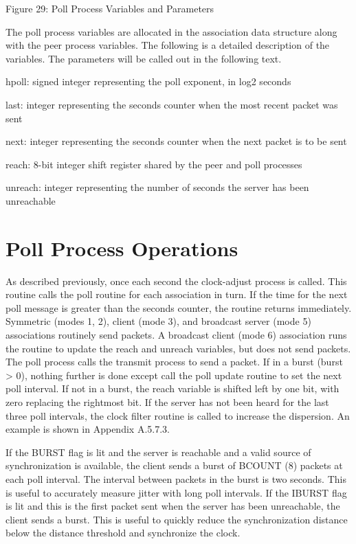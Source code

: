           Figure 29: Poll Process Variables and Parameters

The poll process variables are allocated in the association data
structure along with the peer process variables.  The following is a
detailed description of the variables.  The parameters will be called
out in the following text.

hpoll: signed integer representing the poll exponent, in log2 seconds

last: integer representing the seconds counter when the most recent
packet was sent

next: integer representing the seconds counter when the next packet
is to be sent

reach: 8-bit integer shift register shared by the peer and poll
processes

unreach: integer representing the number of seconds the server has
been unreachable

\section{Poll Process Operations}

As described previously, once each second the clock-adjust process is
called.  This routine calls the poll routine for each association in
turn.  If the time for the next poll message is greater than the
seconds counter, the routine returns immediately.  Symmetric (modes
1, 2), client (mode 3), and broadcast server (mode 5) associations
routinely send packets.  A broadcast client (mode 6) association runs
the routine to update the reach and unreach variables, but does not
send packets.  The poll process calls the transmit process to send a
packet.  If in a burst (burst > 0), nothing further is done except
call the poll update routine to set the next poll interval.
  If not in a burst, the reach variable is shifted left by one bit,
with zero replacing the rightmost bit.  If the server has not been
heard for the last three poll intervals, the clock filter routine is
called to increase the dispersion.  An example is shown in
Appendix A.5.7.3.

If the BURST flag is lit and the server is reachable and a valid
source of synchronization is available, the client sends a burst of
BCOUNT (8) packets at each poll interval.  The interval between
packets in the burst is two seconds.  This is useful to accurately
measure jitter with long poll intervals.  If the IBURST flag is lit
and this is the first packet sent when the server has been
unreachable, the client sends a burst.  This is useful to quickly
reduce the synchronization distance below the distance threshold and
synchronize the clock.

